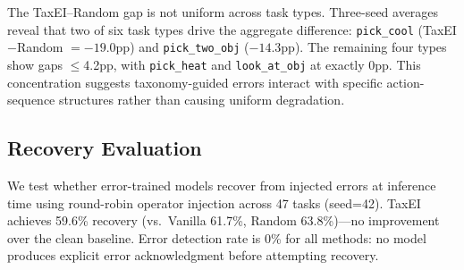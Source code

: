 The TaxEI--Random gap is not uniform across task types. Three-seed averages reveal that two of six task types drive the aggregate difference: \texttt{pick\_cool} (TaxEI$-$Random $= -19.0$pp) and \texttt{pick\_two\_obj} ($-14.3$pp). The remaining four types show gaps $\leq$4.2pp, with \texttt{pick\_heat} and \texttt{look\_at\_obj} at exactly 0pp. This concentration suggests taxonomy-guided errors interact with specific action-sequence structures rather than causing uniform degradation.

\subsection{Recovery Evaluation}
\label{sec:recovery}

We test whether error-trained models recover from injected errors at inference time using round-robin operator injection across 47 tasks (seed=42). TaxEI achieves 59.6\% recovery (vs.\ Vanilla 61.7\%, Random 63.8\%)---no improvement over the clean baseline. Error detection rate is 0\% for all methods: no model produces explicit error acknowledgment before attempting recovery.
